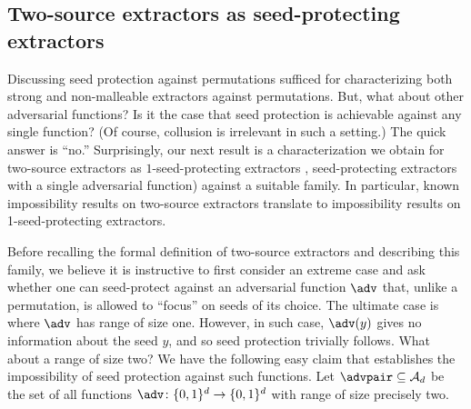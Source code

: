 \documentclass{toc}
\begin{document}
%

\subsection{Two-source extractors as seed-protecting extractors}\label{sec:intro two source sp}

Discussing seed protection against permutations sufficed for characterizing both strong and non-malleable extractors against permutations. 
But, what about other adversarial functions? Is it the case that seed protection is achievable against any single function?
%
(Of course, collusion is irrelevant in such a setting.) %
The quick answer is %
``no.''   %
Surprisingly, our next result is a characterization we obtain for two-source extractors as $1$-seed-protecting extractors %
\ie,  %
seed-protecting extractors with a single adversarial function) against a suitable family. In particular, known impossibility results on two-source extractors translate to impossibility results on 1-seed-protecting extractors. %

%

Before recalling the formal definition of two-source extractors and describing this family, we believe it is instructive to first consider an extreme case and ask whether one can seed-protect against an adversarial function $\adv$ that, unlike a permutation, is allowed to ``focus'' on seeds of its choice.  The ultimate case is where $\adv$ has range of size one.  %
%
%
However, in such case, $\adv(y)$ gives no information about the seed $y$, and so seed %
protection  %
trivially follows. What about
a  %
range of size two? We have the following easy claim that establishes
the  %
%
impossibility of seed protection against such functions. Let $\advpair \subseteq \mathcal{A}_d$ be the set of all functions $\adv \colon \{0,1\}^d \to \{0,1\}^d$ with range of size precisely two.
%
\end{document}
